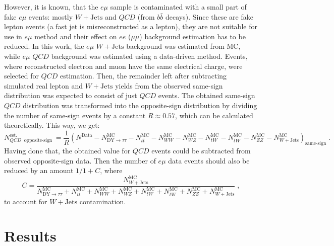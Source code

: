 \documentclass[a0,portrait]{a0poster}
\DeclareMathOperator{\samesign}{same-sign}
\DeclareMathOperator{\oppositesign}{opposite-sign}
\begin{document}
\begin{multicols}{2}
\noindent However, it is known, that the $e\mu$ sample is contaminated with a small part of fake $e\mu$ events: mostly $W+\mathrm{Jets}$
and $QCD$ (from $b\bar{b}$ decays).
Since these are fake lepton events (a fast jet is misreconstructed as a lepton), they are not suitable for use in $e\mu$ method
and their effect on $ee$ ($\mu\mu$) background estimation has to be reduced.
In this work, the $e\mu$ $W+\mathrm{Jets}$ background was estimated from MC, while $e\mu$ $QCD$ background was estimated using
a data-driven method.
Events, where reconstructed electron and muon have the same electrical charge, were selected for $QCD$ estimation.
Then, the remainder left after subtracting simulated real lepton and $W+\mathrm{Jets}$ yields from the observed same-sign
distribution was expected to consist of just $QCD$ events.
The obtained same-sign $QCD$ distribution was transformed into the opposite-sign distribution by dividing the number of
same-sign events by a constant $R\approx 0.57$, which can be calculated theoretically.
This way, we get:
\begin{equation}
	\label{eq:QCDest}
	N_{QCD \; \mathrm{\oppositesign}}^{\mathrm{est.}} = \frac{1}{R} \left( N^{\mathrm{Data}} - N_{\mathrm{DY}\rightarrow\tau\tau}^{\mathrm{MC}} -
	N_{t\bar{t}}^{\mathrm{MC}} - N_{WW}^{\mathrm{MC}} - N_{WZ}^{\mathrm{MC}} - N_{tW}^{\mathrm{MC}} - N_{\bar{t}W}^{\mathrm{MC}} -
	N_{ZZ}^{\mathrm{MC}} - N_{W+\mathrm{Jets}}^{\mathrm{MC}} \right)_{\mathrm{\samesign}} \; .
\end{equation}
Having done that, the obtained value for $QCD$ events could be subtracted from observed opposite-sign data.
Then the number of $e\mu$ data events should also be reduced by an amount $1/1+C$, where
\begin{equation*}
	C = \frac{ N_{W+\mathrm{Jets}}^{\mathrm{MC}} } { N_{\mathrm{DY}\rightarrow\tau\tau}^{\mathrm{MC}} + 
	N_{t\bar{t}}^{\mathrm{MC}} + N_{WW}^{\mathrm{MC}} + N_{WZ}^{\mathrm{MC}} + N_{tW}^{\mathrm{MC}} + N_{\bar{t}W}^{\mathrm{MC}} +
	N_{ZZ}^{\mathrm{MC}} + N_{W+\mathrm{Jets}}^{\mathrm{MC}} } \; ,
\end{equation*}
to account for $W+\mathrm{Jets}$ contamination.

\section*{Results}


\end{multicols}
\end{document}
